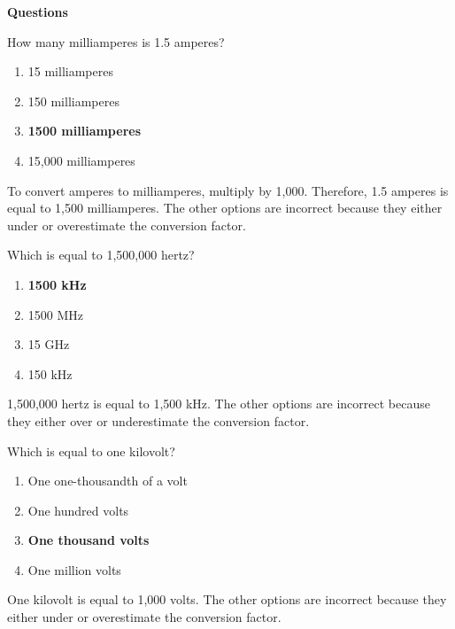 \textbf{Questions}

\begin{tcolorbox}[colback=gray!10!white,colframe=black!75!black,title={T5B01}]
    How many milliamperes is 1.5 amperes?
    \begin{enumerate}[label=\Alph*),noitemsep]
        \item 15 milliamperes
        \item 150 milliamperes
        \item \textbf{1500 milliamperes}
        \item 15,000 milliamperes
    \end{enumerate}
\end{tcolorbox}
To convert amperes to milliamperes, multiply by 1,000. Therefore, 1.5 amperes is equal to 1,500 milliamperes. The other options are incorrect because they either under or overestimate the conversion factor.

\begin{tcolorbox}[colback=gray!10!white,colframe=black!75!black,title={T5B02}]
    Which is equal to 1,500,000 hertz?
    \begin{enumerate}[label=\Alph*),noitemsep]
        \item \textbf{1500 kHz}
        \item 1500 MHz
        \item 15 GHz
        \item 150 kHz
    \end{enumerate}
\end{tcolorbox}
1,500,000 hertz is equal to 1,500 kHz. The other options are incorrect because they either over or underestimate the conversion factor.

\begin{tcolorbox}[colback=gray!10!white,colframe=black!75!black,title={T5B03}]
    Which is equal to one kilovolt?
    \begin{enumerate}[label=\Alph*),noitemsep]
        \item One one-thousandth of a volt
        \item One hundred volts
        \item \textbf{One thousand volts}
        \item One million volts
    \end{enumerate}
\end{tcolorbox}
One kilovolt is equal to 1,000 volts. The other options are incorrect because they either under or overestimate the conversion factor.

